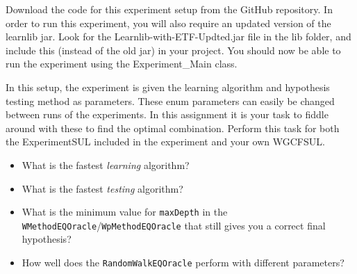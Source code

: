 \documentclass[a4paper]{article}
\begin{document}
Download the code for this experiment setup from the GitHub repository. In order to run this experiment, you will also require an updated version of the learnlib jar. Look for the Learnlib-with-ETF-Updted.jar file in the lib folder, and include this (instead of the old jar) in your project. You should now be able to run the experiment using the Experiment\_Main class.

In this setup, the experiment is given the learning algorithm and hypothesis testing method as parameters. These enum parameters can easily be changed between runs of the experiments. In this assignment it is your task to fiddle around with these to find the optimal combination. Perform this task for both the ExperimentSUL included in the experiment and your own WGCFSUL. 

\begin{itemize}
     \item What is the fastest \emph{learning} algorithm? 
     \item What is the fastest \emph{testing} algorithm? 
     \item What is the minimum value for \texttt{maxDepth} in the \texttt{WMethodEQOracle}/\texttt{WpMethodEQOracle} that still gives you a correct final hypothesis?
     \item How well does the \texttt{RandomWalkEQOracle} perform with different parameters?
\end{itemize}
\end{document}
